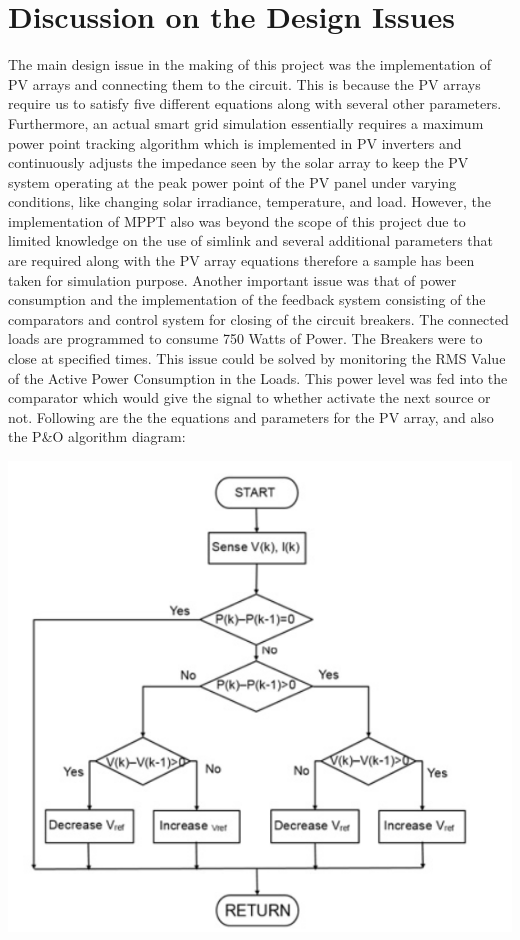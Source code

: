 \documentclass[12pt]{report}
\begin{document}
\section*{Discussion on the Design Issues}
The main design issue in the making of this project was the implementation of PV arrays and connecting them to the circuit. This is because the PV arrays require us to satisfy five different equations along with several other parameters. Furthermore, an actual smart grid simulation essentially requires a maximum power point tracking algorithm which is implemented in PV inverters and continuously adjusts the impedance seen by the solar array to keep the PV system operating at the peak power point of the PV panel under varying conditions, like changing solar irradiance, temperature, and load. However, the implementation of MPPT also was beyond the scope of this project due to limited knowledge on the use of simlink and several additional parameters that are required along with the PV array equations therefore a sample has been taken for simulation purpose. Another important issue was that of power consumption and the implementation of the feedback system consisting of the comparators and control system for closing of the circuit breakers. The connected loads are programmed to consume 750 Watts of Power. The Breakers were to close at specified times. This issue could be solved by monitoring the RMS Value of the Active Power Consumption in the Loads. This power level was fed into the comparator which would give the signal to whether activate the next source or not. Following are the the equations and parameters for the PV array, and also the P\&O algorithm diagram:
\begin{center}
\includegraphics[scale=0.8]{pics/1.PNG}
\end{center}
\end{document}
